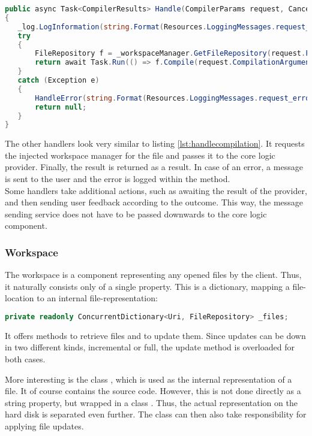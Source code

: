 \begin{lstlisting}[language=csharp, caption={Handling Compilation}, captionpos=b, label={lst:handlecompilation}]
public async Task<CompilerResults> Handle(CompilerParams request, CancellationToken cancellationToken)
{
   _log.LogInformation(string.Format(Resources.LoggingMessages.request_handle, _method));
   try
   {
       FileRepository f = _workspaceManager.GetFileRepository(request.FileToCompile);
       return await Task.Run(() => f.Compile(request.CompilationArguments), cancellationToken);
   }
   catch (Exception e)
   {
       HandleError(string.Format(Resources.LoggingMessages.request_error, _method), e);
       return null;
   }
}
\end{lstlisting}

The other handlers look very similar to listing \ref{lst:handlecompilation}.
It requests the injected workspace manager for the file and passes it to the core logic provider.
Finally, the result is returned as a result.
In case of an error, a message is sent to the user and the error is logged within the  method.\\

Some handlers take additional actions, such as awaiting the result of the provider, and then sending user feedback according to the outcome.
This way, the message sending service does not have to be passed downwards to the core logic component.

\subsubsection{Workspace}
The workspace is a component representing any opened files by the client.
Thus, it naturally consists only of a single property.
This is a dictionary, mapping a file-location to an internal file-representation:

\begin{lstlisting}[language=csharp, caption={Workspace Property}, captionpos=b, label={lst:workspaceproperty}]
private readonly ConcurrentDictionary<Uri, FileRepository> _files;
\end{lstlisting}

It offers methods to retrieve files and to update them.
Since updates can be down in two different kinds, incremental or full, the update method is overloaded for both cases.

More interesting is the class , which is used as the internal representation of a file.
It of course contains the source code.
However, this is not done directly as a string property, but wrapped in a class .
Thus, the actual representation on the hard disk is separated even further.
The  class can then also take responsibility for applying file updates.\\

